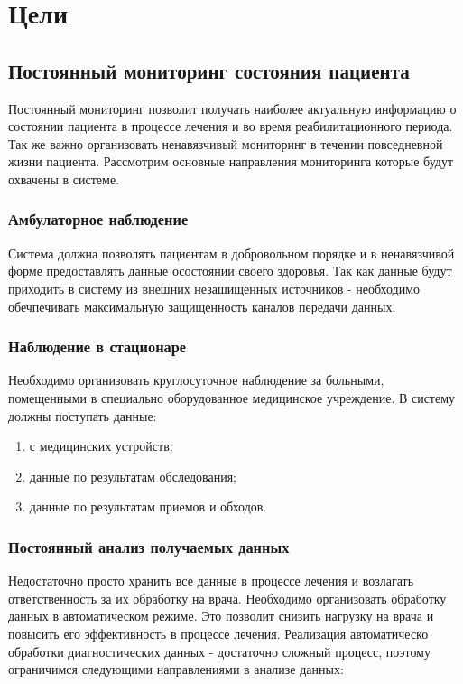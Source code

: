 \newpage
\section{Цели}
\subsection{Постоянный мониторинг состояния пациента	}

Постоянный мониторинг позволит получать наиболее актуальную информацию о
состоянии пациента в процессе лечения и во время реабилитационного периода. Так
же важно организовать ненавязчивый мониторинг в течении повседневной жизни
пациента. Рассмотрим основные направления мониторинга которые будут охвачены в
системе.

\subsubsection{Амбулаторное наблюдение}

Система должна позволять пациентам в добровольном порядке и в ненавязчивой форме
предоставлять данные осостоянии своего здоровья. Так как данные будут приходить
в систему из внешних незашищенных источников - необходимо обечпечивать
максимальную защищенность каналов передачи данных.

\subsubsection{Наблюдение в стационаре}

Необходимо организовать круглосуточное наблюдение за больными, помещенными в
специально оборудованное медицинское учреждение. В систему должны поступать
данные:

\begin{enumerate}
	\item с медицинских устройств;
	\item данные по результатам обследования;
	\item данные по результатам приемов и обходов.
\end{enumerate}

\subsubsection{Постоянный анализ получаемых данных}

Недостаточно просто хранить все данные в процессе лечения и возлагать
ответственность за их обработку на врача. Необходимо организовать обработку
данных в автоматическом режиме. Это позволит снизить нагрузку на врача и
повысить его эффективность в процессе лечения.
Реализация автоматическо обработки диагностических данных - достаточно сложный
процесс, поэтому ограничимся следующими направлениями в анализе данных:

